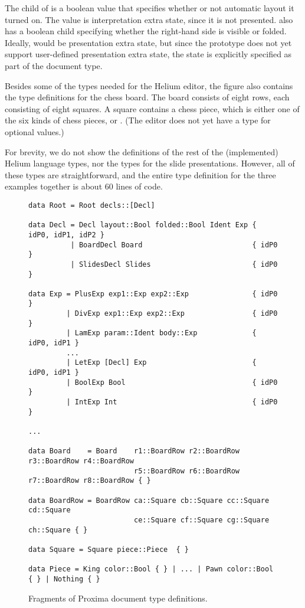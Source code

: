 The  child of  is a boolean value that specifies whether or not automatic layout it turned on. The value is interpretation extra state, since it is not presented.   also has a boolean child  specifying whether the right-hand side is visible or folded. Ideally,  would be presentation extra state, but since the prototype does not yet support user-defined presentation extra state, the  state is explicitly specified as part of the document type.

Besides some of the types needed for the Helium editor, the figure also contains the type definitions for the chess board. The board consists of eight rows, each consisting of eight squares. A square contains a chess piece, which is either one of the six kinds of chess pieces, or . (The editor does not yet have a  type for optional values.)

For brevity, we do not show the definitions of the rest of the (implemented) Helium language types, nor the types for the slide presentations. However, all of these types are straightforward, and the entire type definition for the three examples together is about 60 lines of code.


\begin{figure}[t]
\begin{small}
\begin{center}
\begin{footnotesize}
\begin{verbatim}
data Root = Root decls::[Decl]

data Decl = Decl layout::Bool folded::Bool Ident Exp { idP0, idP1, idP2 }
          | BoardDecl Board                          { idP0 }
          | SlidesDecl Slides                        { idP0 }

data Exp = PlusExp exp1::Exp exp2::Exp               { idP0 }
         | DivExp exp1::Exp exp2::Exp                { idP0 }
         | LamExp param::Ident body::Exp             { idP0, idP1 }
         ...
         | LetExp [Decl] Exp                         { idP0, idP1 }
         | BoolExp Bool                              { idP0 }
         | IntExp Int                                { idP0 }

...

data Board    = Board    r1::BoardRow r2::BoardRow r3::BoardRow r4::BoardRow
                         r5::BoardRow r6::BoardRow r7::BoardRow r8::BoardRow { }

data BoardRow = BoardRow ca::Square cb::Square cc::Square cd::Square
                         ce::Square cf::Square cg::Square ch::Square { }

data Square = Square piece::Piece  { }

data Piece = King color::Bool { } | ... | Pawn color::Bool { } | Nothing { }
\end{verbatim}
\end{footnotesize}
\caption{Fragments of Proxima document type definitions.}\label{docTypeExample} 
\end{center}
\end{small}
\end{figure}

